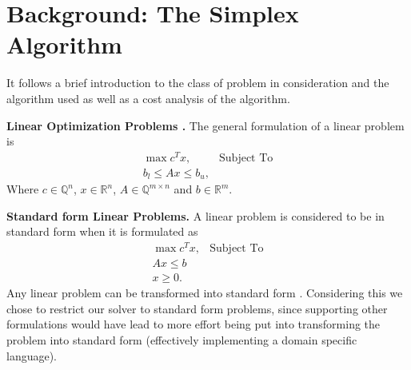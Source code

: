 \documentclass[letterpaper]{article}
\newcommand{\mypar}[1]{{\bf #1.}}
\begin{document}

\section{Background: The Simplex Algorithm}\label{sec:background}
It follows a brief introduction to the class of problem in consideration
and the algorithm used as well as a cost analysis of the algorithm.

\mypar{Linear Optimization Problems \cite{dantzig}}
The general formulation of a linear problem is
\begin{eqnarray*}
    \max c^T x, & \text{Subject To}\\
    b_l \leq A x \leq b_u,
\end{eqnarray*}
Where $c \in \mathbb{Q}^n$, $x \in \mathbb{R}^n$, $A \in \mathbb{Q}^{m \times n}$ and $b \in \mathbb{R}^m$.

\mypar{Standard form Linear Problems}
A linear problem is considered to be in standard form when it is formulated as
\begin{eqnarray*}
    \max c^T x, & \text{Subject To}\\
    A x \leq b \\
    x \geq 0.
\end{eqnarray*}
Any linear problem can be transformed into standard form \cite{groetschel}. 
Considering this we chose to restrict our solver to standard form problems, since supporting other formulations would have lead to more effort being put into transforming the problem into standard form (effectively implementing a domain specific language).
\end{document}

